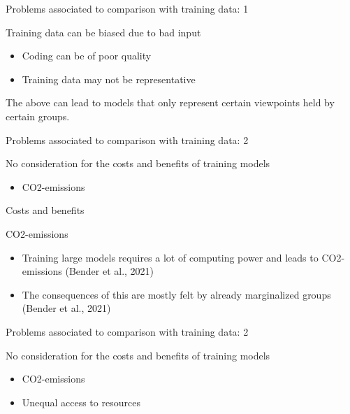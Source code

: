\documentclass[compress]{beamer}
\begin{document}
\begin{frame}[fragile]{Problems associated to comparison with training data: 1} 	
	\begin{alertblock}{Training data can be biased due to bad input}
		\begin{itemize}
			\item Coding can be of poor quality
			\item Training data may not be representative
		\end{itemize}
	\end{alertblock}
The above can lead to models that only represent certain viewpoints held by certain groups.
\end{frame}


\begin{frame}[fragile]{Problems associated to comparison with training data: 2} 	
	\begin{alertblock}{No consideration for the costs and benefits of training models}
		\begin{itemize}
			\item CO2-emissions
		\end{itemize}
	\end{alertblock}
\end{frame}

\begin{frame}[fragile]{Costs and benefits} 	
	\begin{alertblock}{CO2-emissions}
		\begin{itemize}
			\item Training large models requires a lot of computing power and leads to CO2-emissions (Bender et al., 2021)
			\item The consequences of this are mostly felt by already marginalized groups (Bender et al., 2021)
		\end{itemize}
	\end{alertblock}
\end{frame}


\begin{frame}[fragile]{Problems associated to comparison with training data: 2} 	
	\begin{alertblock}{No consideration for the costs and benefits of training models}
		\begin{itemize}
			\item CO2-emissions
			\item Unequal access to resources
		\end{itemize}
	\end{alertblock}
\end{frame}
\end{document}
